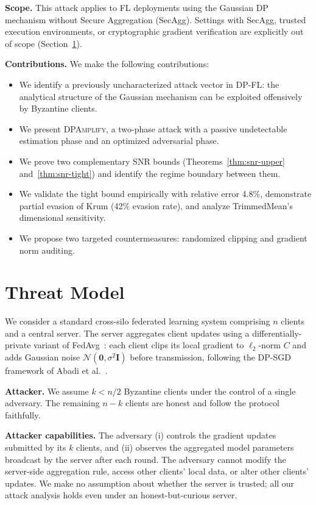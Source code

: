 \documentclass[conference]{IEEEtran}
\begin{document}
\textbf{Scope.} This attack applies to FL deployments
using the Gaussian DP mechanism without Secure
Aggregation (SecAgg). Settings with SecAgg,
trusted execution environments, or cryptographic
gradient verification are explicitly out of scope
(Section~\ref{sec:threat}).

\textbf{Contributions.} We make the following
contributions:
\begin{itemize}
    \item We identify a previously uncharacterized
    attack vector in DP-FL: the analytical structure
    of the Gaussian mechanism can be exploited
    offensively by Byzantine clients.
    \item We present \textsc{DPAmplify}, a two-phase
    attack with a passive undetectable estimation
    phase and an optimized adversarial phase.
    \item We prove two complementary SNR bounds
    (Theorems~\ref{thm:snr-upper}
    and~\ref{thm:snr-tight}) and
    identify the regime boundary between them.
    \item We validate the tight bound empirically
    with relative error 4.8\%, demonstrate partial
    evasion of Krum (42\% evasion rate), and analyze
    TrimmedMean's dimensional sensitivity.
    \item We propose two targeted countermeasures:
    randomized clipping and gradient norm auditing.
\end{itemize}

\section{Threat Model}
\label{sec:threat}

We consider a standard cross-silo federated learning system
comprising $n$ clients and a central server. The server
aggregates client updates using a differentially-private
variant of FedAvg~\cite{mcmahan2017communication}: each
client clips its local gradient to $\ell_2$-norm $C$ and
adds Gaussian noise $\mathcal{N}(\mathbf{0}, \sigma^2
\mathbf{I})$ before transmission, following the DP-SGD
framework of Abadi et al.~\cite{abadi2016deep}.

\textbf{Attacker.} We assume $k < n/2$ Byzantine clients
under the control of a single adversary. The remaining
$n - k$ clients are honest and follow the protocol
faithfully.

\textbf{Attacker capabilities.} The adversary
(i) controls the gradient updates submitted by its $k$
clients, and
(ii) observes the aggregated model parameters broadcast
by the server after each round.
The adversary cannot modify the server-side aggregation
rule, access other clients' local data, or alter other
clients' updates. We make no assumption about whether the
server is trusted; all our attack analysis holds even
under an honest-but-curious server.
\end{document}
